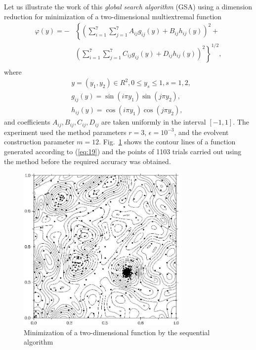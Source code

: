 \documentclass[smallcondensed]{svjour3}     %
\begin{document}
Let us illustrate the work of this \textit{global search algorithm} (GSA) using a dimension reduction for minimization of a two-dimensional multiextremal function
\begin{eqnarray} \nonumber \label{eq:19}
\varphi(y)= -&\left\{\left(\sum^{7}_{i=1}\sum^{7}_{j=1}A_{ij}g_{ij}(y)+B_{ij}h_{ij}(y)\right)^2+\right. \\
&\left.\left(\sum^{7}_{i=1}\sum^{7}_{j=1}C_{ij}g_{ij}(y)+D_{ij}h_{ij}(y)\right)^2\right\}^{1/2},\\ \nonumber
\end{eqnarray}
where
\begin{eqnarray} \nonumber
& y=(y_1,y_2)\in R^2, 0 \leq y_s \leq 1, s=1,2, \\ \nonumber
& g_{ij}(y)=\sin(i\pi y_1)\sin(j\pi y_2),  \\ \nonumber
& h_{ij}(y)=\cos(i\pi y_1)\cos(j\pi y_2), \nonumber 
\end{eqnarray}
and coefficients $A_{ij}, B_{ij}, C_{ij}, D_{ij}$  are taken uniformly in the interval $[-1,1]$. The experiment used the method parameters $r=3$, $\epsilon=10^{-3}$, and the evolvent construction parameter $m=12$. Fig.~\ref{fig:1} shows the contour lines of a function generated according to (\ref{eq:19}) and the points of 1103 trials carried out using the method before the required accuracy was obtained.
\begin{figure}
	\center
  \includegraphics[width=0.75\textwidth]{fig2.jpg} 
  \caption{Minimization of a two-dimensional function by the sequential algorithm}
  \label{fig:1}       %
\end{figure}
\end{document}
